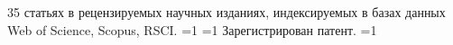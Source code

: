          35 статьях в рецензируемых научных изданиях, индексируемых в базах данных Web of Science, Scopus, RSCI. %
        \ifnum \value{citeregistered}=1%
           \ifnum \value{citeauthorpatent}=1%
               Зарегистрирован  патент.
           \fi%
           \ifnum \value{citeauthorprogram}=1%
